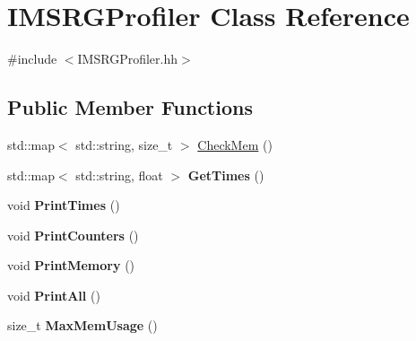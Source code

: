 \hypertarget{classIMSRGProfiler}{}\section{I\+M\+S\+R\+G\+Profiler Class Reference}
\label{classIMSRGProfiler}


{\ttfamily \#include $<$I\+M\+S\+R\+G\+Profiler.\+hh$>$}

\subsection*{Public Member Functions}
\begin{DoxyCompactItemize}
\item 
std\+::map$<$ std\+::string, size\+\_\+t $>$ \hyperlink{classIMSRGProfiler_a4a86bec6848acb4af9d7ea273ed74db2}{Check\+Mem} ()
\item 
\mbox{\label{classIMSRGProfiler_a0a556388784109b4cab0021158330d55}} 
std\+::map$<$ std\+::string, float $>$ {\bfseries Get\+Times} ()
\item 
\mbox{\label{classIMSRGProfiler_a392fe60d4fee6ac9fdbebcfad8e7c706}} 
void {\bfseries Print\+Times} ()
\item 
\mbox{\label{classIMSRGProfiler_acba9c1ab82539014b1def03f15f4e482}} 
void {\bfseries Print\+Counters} ()
\item 
\mbox{\label{classIMSRGProfiler_a65d6a848588a1bcd74dbed0c5c2ffd39}} 
void {\bfseries Print\+Memory} ()
\item 
\mbox{\label{classIMSRGProfiler_a86120130efc761d87254117e245d677c}} 
void {\bfseries Print\+All} ()
\item 
\mbox{\label{classIMSRGProfiler_a943695f9c876fa41c4dd4ff92c6034d3}} 
size\+\_\+t {\bfseries Max\+Mem\+Usage} ()
\end{DoxyCompactItemize}
